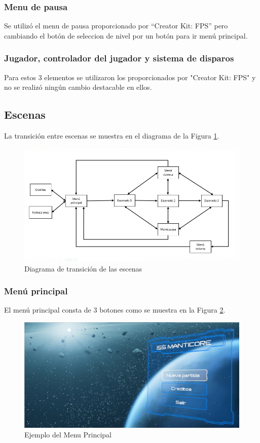 \subsubsection{Menu de pausa}
Se utilizó el menu de pausa proporcionado por ``Creator Kit: FPS'' pero cambiando el botón de seleccion de nivel por un botón para ir menú principal.

\subsubsection{Jugador, controlador del jugador y sistema de disparos}
Para estos 3 elementos se utilizaron los proporcionados por "Creator Kit: FPS" y no se realizó ningún cambio destacable en ellos.

\subsection{Escenas}

La transición entre escenas se muestra en el diagrama de la Figura \ref{fig:TrasicionEscenas3D}. 

\begin{figure}[H]
	\centering
	\includegraphics[scale=0.60]{imagenes/transicionEscenas3D.png}
	\caption{\label{fig:TrasicionEscenas3D}Diagrama de transición de las escenas}
\end{figure}

\subsubsection{Menú principal}
El menú principal consta de 3 botones como se muestra en la Figura \ref{fig:MenuPrincipal3D1}.
\begin{figure}[H]
	\centering
	\includegraphics[scale=0.35]{imagenes/MenuPrincipal3D1.png}
	\caption{\label{fig:MenuPrincipal3D1}Ejemplo del Menu Principal}
\end{figure}

